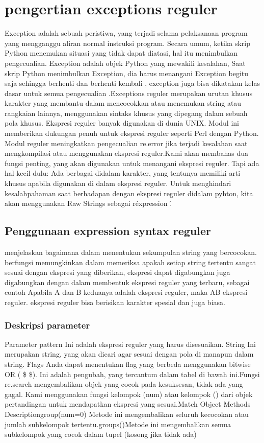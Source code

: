 \section{pengertian exceptions reguler}
Exception adalah sebuah peristiwa, yang terjadi selama pelaksanaan program yang mengganggu aliran normal instruksi program. Secara umum, ketika skrip Python menemukan situasi yang tidak dapat diatasi, hal itu menimbulkan pengecualian. Exception adalah objek Python yang mewakili kesalahan, Saat  skrip Python menimbulkan Exception, dia harus menangani Exception begitu saja sehingga berhenti dan berhenti kembali , exception juga bisa dikatakan kelas dasar untuk semua pengecualian .Exceptions reguler merupakan urutan khusus karakter yang membantu dalam mencocokkan atau menemukan string atau rangkaian lainnya, menggunakan sintaks khusus yang dipegang dalam sebuah pola khusus. Ekspresi reguler banyak digunakan di dunia UNIX. Modul ini memberikan dukungan penuh untuk ekspresi reguler seperti Perl dengan Python. Modul reguler meningkatkan pengecualian re.error jika terjadi kesalahan saat mengkompilasi atau menggunakan ekspresi reguler.Kami akan membahas dua fungsi penting, yang akan digunakan untuk menangani ekspresi reguler. Tapi ada hal kecil dulu: Ada berbagai didalam karakter, yang tentunya memiliki arti khusus apabila digunakan di dalam ekspresi reguler. Untuk menghindari kesalahpahaman  saat berhadapan dengan ekspresi reguler didalam pyhton, kita akan menggunakan Raw Strings sebagai r\'expression \'.

\subsection{Penggunaan expression syntax reguler}
menjelaskan bagaimana dalam menentukan sekumpulan string yang bercocokan. berfungsi memungkinkan dalam memeriksa apakah setiap string
tertentu sangat sesuai dengan ekspresi yang diberikan, ekspresi dapat digabungkan juga digabungkan dengan dalam membentuk ekspresi reguler yang terbaru, sebagai contoh Apabila A dan B  keduanya adalah ekspresi reguler, maka AB ekspresi reguler. ekspresi reguler 
bisa berisikan karakter spesial dan juga biasa.

\subsubsection{Deskripsi parameter}
Parameter pattern Ini adalah ekspresi reguler yang harus disesuaikan. String Ini merupakan string, yang akan dicari agar sesuai dengan pola di manapun dalam string. Flags Anda dapat menentukan flag yang berbeda menggunakan bitwise OR ( \$  \vert  \$). Ini adalah pengubah, yang tercantum dalam tabel di bawah ini.Fungsi re.search mengembalikan objek yang cocok pada kesuksesan, tidak ada yang gagal. Kami menggunakan fungsi kelompok (num) atau kelompok () dari objek pertandingan untuk mendapatkan ekspresi yang sesuai.Match Object Methods Descriptiongroup(num=0) Metode ini mengembalikan seluruh kecocokan atau jumlah subkelompok tertentu.groups()Metode ini mengembalikan semua subkelompok yang cocok dalam tupel (kosong jika tidak ada) 

